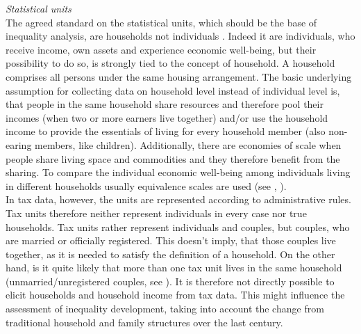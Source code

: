 \documentclass[twoside]{article}\usepackage[]{graphicx}\usepackage[]{color}
\begin{document}
\begin{multicols}{2}





\emph{Statistical units} \\
The agreed standard on the statistical units, which should be the base of inequality analysis, are households not individuals \citep[60]{oecd_oecd_2013}. Indeed it are individuals, who receive income, own assets and experience economic well-being, but their possibility to do so, is strongly tied to the concept of household. A household comprises all persons under the same housing arrangement. The basic underlying assumption for collecting data on household level instead of individual level is, that people in the same household share resources and therefore pool their incomes (when two or more earners live together) and/or use the household income to provide the essentials of living for every household member (also non-earing members, like children). Additionally, there are economies of scale when people share living space and commodities and they therefore benefit from the sharing. To compare the individual economic well-being among individuals living in different households usually equivalence scales are used (see \citealt[173]{oecd_oecd_2013}, \citealt{buhmann_equivalence_1988}). \\

In tax data, however, the units are represented according to administrative rules. Tax units therefore neither represent individuals in every case nor true households. Tax units rather represent individuals and couples, but couples, who are married or officially registered. This doesn't imply, that those couples live together, as it is needed to satisfy the definition of a household. On the other hand, is it quite likely that more than one tax unit lives in the same household (unmarried/unregistered couples, see \citet[99]{muller_vermogenslage_2014}). It is therefore not directly possible to elicit households and household income from tax data. This might influence the assessment of inequality development, taking into account the change from traditional household and family structures over the last century. \\



\end{multicols}
\end{document}
